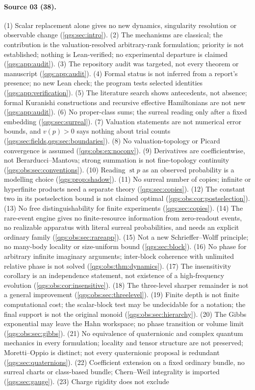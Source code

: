 \documentclass[11pt,oneside]{article}
\numberwithin{equation}{section}
\theoremstyle{plain}
\theoremstyle{definition}
\theoremstyle{remark}
\DeclareMathOperator{\st}{st}
\begin{document}
\paragraph{Source 03 (38).}
(1) Scalar replacement alone gives no new dynamics, singularity resolution or observable change (\cref{qgs:sec:intro}). (2) The mechanisms are classical; the contribution is the valuation-resolved arbitrary-rank formulation; priority is not established; nothing is Lean-verified; no experimental departure is claimed (\cref{qgs:app:audit}). (3) The repository audit was targeted, not every theorem or manuscript (\cref{qgs:app:audit}). (4) Formal status is not inferred from a report's presence; no new Lean check; the program tests selected identities (\cref{qgs:app:verification}). (5) The literature search shows antecedents, not absence; formal Kuranishi constructions and recursive effective Hamiltonians are not new (\cref{qgs:app:audit}). (6) No proper-class sums; the surreal reading only after a fixed embedding (\cref{qgs:sec:surreal}). (7) Valuation statements are not numerical error bounds, and $v(p)>0$ says nothing about trial counts (\cref{qgs:sec:fields,qgs:sec:boundaries}). (8) No valuation-topology or Picard convergence is assumed (\cref{qgs:obs:ex:noconv}). (9) Derivatives are coefficientwise, not Berarducci--Mantova; strong summation is not fine-topology continuity (\cref{qgs:obs:sec:conventions}). (10) Reading $\st p$ as an observed probability is a modelling choice (\cref{qgs:prop:shadow}). (11) No surreal number of copies; infinite or hyperfinite products need a separate theory (\cref{qgs:sec:copies}). (12) The constant two in its postselection bound is not claimed optimal (\cref{qgs:obs:cor:postselection}). (13) No free distinguishability for finite experiments (\cref{qgs:sec:copies}). (14) The rare-event engine gives no finite-resource information from zero-readout events, no realizable apparatus with literal surreal probabilities, and needs an explicit ordinary family (\cref{qgs:obs:sec:rareapp}). (15) Not a new Schrieffer--Wolff principle; no many-body locality or size-uniform bound (\cref{qgs:sec:block}). (16) No phase for arbitrary infinite imaginary arguments; inter-block coherence with unlimited relative phase is not solved (\cref{qgs:obs:thm:dynamics}). (17) The insensitivity corollary is an independence statement, not existence of a high-frequency evolution (\cref{qgs:obs:cor:insensitive}). (18) The three-level sharper remainder is not a general improvement (\cref{qgs:obs:sec:threelevel}). (19) Finite depth is not finite computational cost; the scalar-block test may be undecidable for a notation; the final support is not the original monoid (\cref{qgs:obs:sec:hierarchy}). (20) The Gibbs exponential may leave the Hahn workspace; no phase transition or volume limit (\cref{qgs:obs:sec:gibbs}). (21) No equivalence of quaternionic and complex quantum mechanics in every formulation; locality and tensor structure are not preserved; Moretti--Oppio is distinct; not every quaternionic proposal is redundant (\cref{qgs:sec:quaternions}). (22) Coefficient extension on a fixed ordinary bundle, no surreal charts or class-based bundle; Chern--Weil integrality is imported (\cref{qgs:sec:gauge}). (23) Charge rigidity does not exclude 
\end{document}
